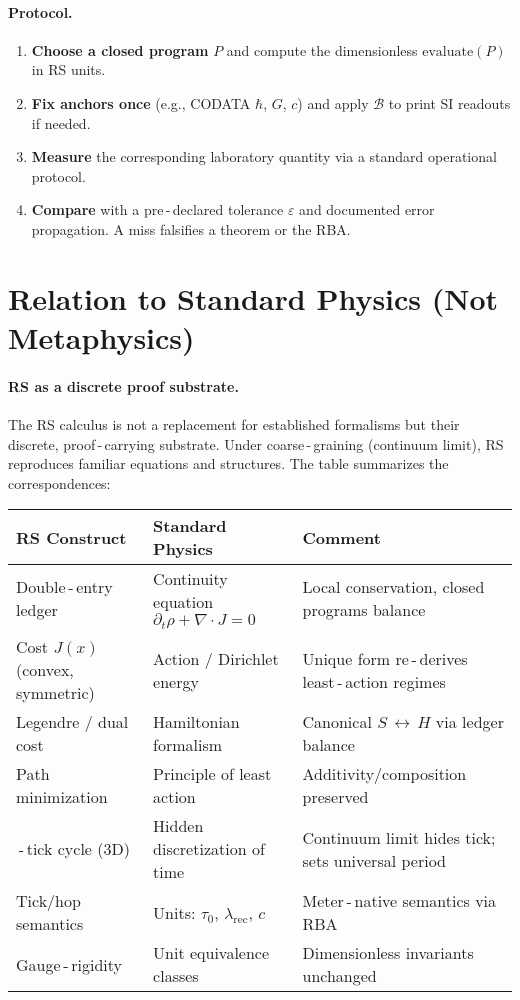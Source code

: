 \documentclass[11pt]{article}
\newcommand{\lamrec}{\lambda_{\mathrm{rec}}}
\newcommand{\tauzero}{\tau_{0}}
\theoremstyle{remark}
\begin{document}
\paragraph{Protocol.}
\begin{enumerate}
  \item \textbf{Choose a closed program} $P$ and compute the dimensionless \(\text{evaluate}(P)\) in RS units.
  \item \textbf{Fix anchors once} (e.g., CODATA $\hbar$, $G$, $c$) and apply $\mathcal B$ to print SI readouts if needed.
  \item \textbf{Measure} the corresponding laboratory quantity via a standard operational protocol.
  \item \textbf{Compare} with a pre\,\mbox{-}\,declared tolerance $\varepsilon$ and documented error propagation. A miss falsifies a theorem or the RBA.
\end{enumerate}

\section{Relation to Standard Physics (Not Metaphysics)}
\paragraph{RS as a discrete proof substrate.}
The RS calculus is not a replacement for established formalisms but their discrete, proof\,\mbox{-}\,carrying substrate. Under coarse\,\mbox{-}\,graining (continuum limit), RS reproduces familiar equations and structures. The table summarizes the correspondences:

\begin{table}[h!]
\centering
\renewcommand{\arraystretch}{1.2}
\setlength{\tabcolsep}{6pt}
\begin{tabularx}{\textwidth}{|>{\raggedright\arraybackslash}X|>{\raggedright\arraybackslash}X|>{\raggedright\arraybackslash}X|}
\hline
\textbf{RS Construct} & \textbf{Standard Physics} & \textbf{Comment} \\
\hline
Double\,\mbox{-}\,entry ledger & Continuity equation $\partial_{t}\rho+\nabla\!\cdot J=0$ & Local conservation, closed programs balance \\
\hline
Cost $J(x)$ (convex, symmetric) & Action / Dirichlet energy & Unique form re\,\mbox{-}\,derives least\,\mbox{-}\,action regimes \\
\hline
Legendre / dual cost & Hamiltonian formalism & Canonical $S\,\leftrightarrow\,H$ via ledger balance \\
\hline
Path minimization & Principle of least action & Additivity/composition preserved \\
\hline
8\,\mbox{-}\,tick cycle (3D) & Hidden discretization of time & Continuum limit hides tick; sets universal period \\
\hline
Tick/hop semantics & Units: $\tauzero$, $\lamrec$, $c$ & Meter\,\mbox{-}\,native semantics via RBA \\
\hline
Gauge\,\mbox{-}\,rigidity & Unit equivalence classes & Dimensionless invariants unchanged \\
\hline
\end{tabularx}
\end{table}
\end{document}

